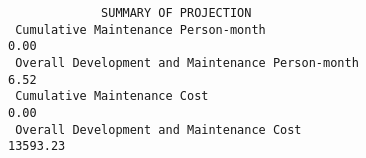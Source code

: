 \documentclass[11pt,a4paper,spanish,twoside]{report}
\begin{document}
{\begin{verbatim}
             SUMMARY OF PROJECTION
 Cumulative Maintenance Person-month                                 0.00
 Overall Development and Maintenance Person-month                    6.52
 Cumulative Maintenance Cost                                         0.00
 Overall Development and Maintenance Cost                        13593.23
\end{verbatim}
}

 

\end{document}
